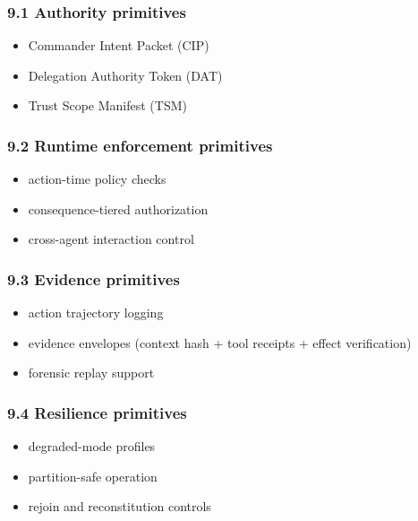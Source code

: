 \documentclass[
]{article}
\providecommand{\tightlist}{%
  \setlength{\itemsep}{0pt}\setlength{\parskip}{0pt}}
\begin{document}
\hypertarget{authority-primitives}{%
\subsubsection{9.1 Authority primitives}\label{authority-primitives}}

\begin{itemize}
\tightlist
\item
  Commander Intent Packet (CIP)
\item
  Delegation Authority Token (DAT)
\item
  Trust Scope Manifest (TSM)
\end{itemize}

\hypertarget{runtime-enforcement-primitives}{%
\subsubsection{9.2 Runtime enforcement
primitives}\label{runtime-enforcement-primitives}}

\begin{itemize}
\tightlist
\item
  action-time policy checks
\item
  consequence-tiered authorization
\item
  cross-agent interaction control
\end{itemize}

\hypertarget{evidence-primitives}{%
\subsubsection{9.3 Evidence primitives}\label{evidence-primitives}}

\begin{itemize}
\tightlist
\item
  action trajectory logging
\item
  evidence envelopes (context hash + tool receipts + effect
  verification)
\item
  forensic replay support
\end{itemize}

\hypertarget{resilience-primitives}{%
\subsubsection{9.4 Resilience primitives}\label{resilience-primitives}}

\begin{itemize}
\tightlist
\item
  degraded-mode profiles
\item
  partition-safe operation
\item
  rejoin and reconstitution controls
\end{itemize}
\end{document}
